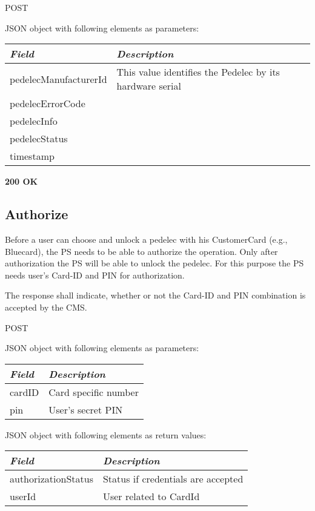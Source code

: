 
 POST

JSON object with following elements as parameters:\\
\begin{tabularx}{\linewidth}{ | l | X | }
  \hline
  \textit{Field} & \textit{Description} \\
  \hline \hline
  pedelecManufacturerId 		& This value identifies the Pedelec by its hardware serial\\
  pedelecErrorCode & \\
  pedelecInfo & \\
  pedelecStatus & \\
  timestamp & \\
  
    \hline
\end{tabularx}

\textbf{200 OK}\\


\subsection{Authorize}

Before a user can choose and unlock a pedelec with his CustomerCard (e.g., Bluecard), the \acs{PS} needs to be able to authorize the operation. Only after authorization the \acs{PS} will be able to unlock the pedelec. For this purpose the \acs{PS} needs user's Card-ID and PIN for authorization.

The response shall indicate, whether or not the Card-ID and PIN combination is accepted by the \acs{CMS}.


 POST

JSON object with following elements as parameters:\\
\begin{tabularx}{\linewidth}{ | l | X | }
  \hline
  \textit{Field} & \textit{Description} \\
  \hline \hline
  	cardID 		& Card specific number\\
  	pin			& User's secret PIN \\
    \hline
\end{tabularx}

JSON object with following elements as return values:\\
\begin{tabularx}{\linewidth}{ | l | X | }
  \hline
  \textit{Field} & \textit{Description} \\
  \hline \hline
  authorizationStatus 		& Status if credentials are accepted \\
  userId						& User related to CardId \\
    \hline
\end{tabularx}

